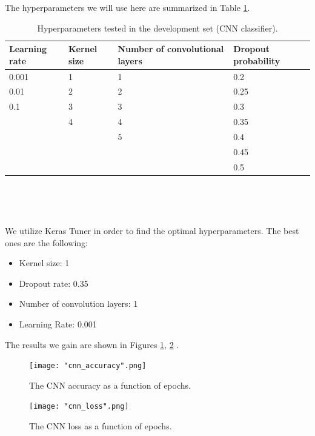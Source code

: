 \documentclass[10pt, a4paper]{article}
\begin{document}
 The hyperparameters we will use here are summarized in Table \ref{tab::ex-2-hyper}.
	
	\begin{table}
		\centering
		\begin{tabular}{|l|l|l|l|}
			\hline
			\rowcolor{blue!25}\textbf{Learning rate} & \cellcolor{blue!25}\textbf{Kernel size} & \cellcolor{blue!25}\textbf{Number of convolutional layers} & \cellcolor{blue!25}\textbf{Dropout probability} \\
			\hline
			0.001 & 1 & 1 & 0.2 \\
			\hline
			0.01 & 2 & 2 & 0.25 \\
			\hline
			0.1 & 3 & 3 & 0.3  \\
			\hline 
			& 4 & 4 & 0.35  \\
			\hline 
			& & 5 & 0.4 \\
			\hline 
			& & & 0.45 \\
			\hline 
			& & & 0.5 \\
			
			
			
			
			\hline
		\end{tabular}
		\caption{Hyperparameters tested in the development set (CNN classifier).}
		\label{tab::ex-2-hyper}
	\end{table}
	
	\ 
	
	
	\
	
	We utilize Keras Tuner in order to find the optimal hyperparameters. The best ones are the following:
	\begin{itemize}
		\item Kernel size: 1
		\item Dropout rate: 0.35
		\item Number of convolution layers: 1
		\item Learning Rate: 0.001
	\end{itemize}

 The results we gain are shown in Figures \ref{fig::cnn_accuracy}, \ref{fig::cnn_loss} .
	
	\begin{figure}
		\centering
		\texttt{[image: "cnn\_accuracy".png]}
		\caption{The CNN accuracy as a function of epochs.}
		\label{fig::cnn_accuracy}
	\end{figure}

	
	\begin{figure}
		\centering
		\texttt{[image: "cnn\_loss".png]}
		\caption{The CNN loss as a function of epochs.}
            \label{fig::cnn_loss}
	\end{figure}
	
\end{document}
